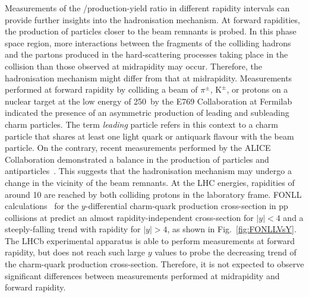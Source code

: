 Measurements of the \ds/\dpl production-yield ratio in different rapidity intervals can provide further insights into the hadronisation mechanism. At forward rapidities, the production of particles closer to the beam remnants is probed. In this phase space region, more interactions between the fragments of the colliding hadrons and the partons produced in the hard-scattering processes taking place in the collision than those observed at midrapidity may occur. Therefore, the hadronisation mechanism might differ from that at midrapidity. Measurements performed at forward rapidity by colliding a beam of $\pi^\pm$, $\mathrm{K^\pm}$, or protons on a nuclear target at the low energy of 250~\gev by the E769 Collaboration at Fermilab~\cite{E769:1996jqf} indicated the presence of an asymmetric production of leading and subleading charm particles. The term \emph{leading} particle refers in this context to a charm particle that shares at least one light quark or antiquark flavour with the beam particle. On the contrary, recent measurements performed by the ALICE Collaboration demonstrated a balance in the production of particles and antiparticles~\cite{ALICE:2023ulv}. This suggests that the hadronisation mechanism may undergo a change in the vicinity of the beam remnants. At the LHC energies, rapidities of around 10 are reached by both colliding protons in the laboratory frame. FONLL calculations~\cite{Cacciari:1998it} for the $y$-differential charm-quark production cross-section in pp collisions at \thirteen predict an almost rapidity-independent cross-section for $\lvert y\rvert<4$ and a steeply-falling trend with rapidity for $\lvert y\rvert>4$, as shown in Fig.~\ref{fig:FONLLVsY}. The LHCb experimental apparatus is able to perform measurements at forward rapidity, but does not reach such large $y$ values to probe the decreasing trend of the charm-quark production cross-section. Therefore, it is not expected to observe significant differences between measurements performed at midrapidity and forward rapidity. 

